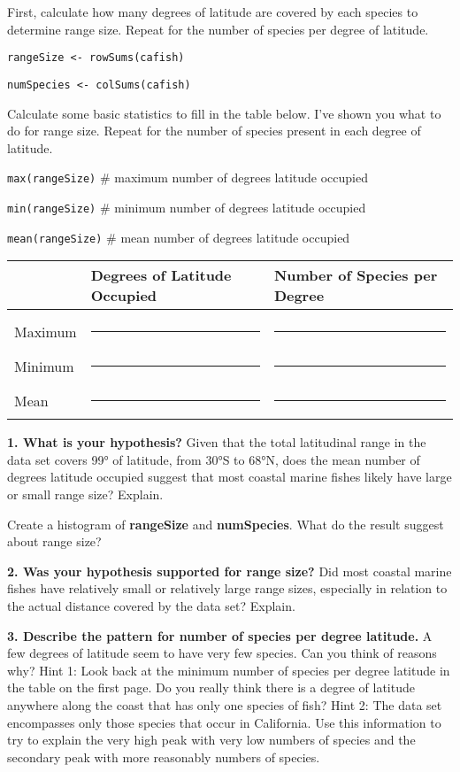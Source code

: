 \documentclass[11pt]{article}
\begin{document}
First, calculate how many degrees of latitude are covered by each
species to determine range size. Repeat for the number of species per
degree of latitude.

\texttt{rangeSize \textless{}- rowSums(cafish)}

\texttt{numSpecies \textless{}- colSums(cafish)}

Calculate some basic statistics to fill in the table below. I've shown
you what to do for range size. Repeat for the number of species present
in each degree of latitude.

\texttt{max(rangeSize)} \qquad \# maximum number of degrees latitude occupied

\texttt{min(rangeSize)} \qquad \# minimum number of degrees latitude occupied

\texttt{mean(rangeSize)} \qquad \# mean number of degrees latitude occupied

\begin{tabular}[l]{@{}lL{1.6in}L{1.6in}@{}}
\toprule
& Degrees of Latitude Occupied & Number of Species per Degree\tabularnewline
\midrule
 & & \\[1ex]
Maximum & \rule{1.5in}{0.4pt} & \rule{1.5in}{0.4pt} \tabularnewline[2ex]
Minimum & \rule{1.5in}{0.4pt} & \rule{1.5in}{0.4pt} \tabularnewline[2ex]
Mean & \rule{1.5in}{0.4pt} & \rule{1.5in}{0.4pt} \tabularnewline
\bottomrule
\end{tabular}

\textbf{1. What is your hypothesis?} Given that the total latitudinal range in
the data set covers 99° of latitude, from 30°S to 68°N, does the mean
number of degrees latitude occupied suggest that most coastal marine
fishes likely have large or small range size? Explain.

\vspace{7\baselineskip}

Create a histogram of \textbf{rangeSize} and \textbf{numSpecies}. What
do the result suggest about range size?

\textbf{2. Was your hypothesis supported for range size?} Did most coastal marine
fishes have relatively small or relatively large range sizes, especially
in relation to the actual distance covered by the data set? Explain.

\vspace{7\baselineskip}

\textbf{3. Describe the pattern for number of species per degree latitude.} A few
degrees of latitude seem to have very few species. Can you think of
reasons why? Hint 1: Look back at the minimum number of species per
degree latitude in the table on the first page. Do you really think
there is a degree of latitude anywhere along the coast that has only one
species of fish? Hint 2: The data set encompasses only those species
that occur in California. Use this information to try to explain the
very high peak with very low numbers of species and the secondary peak
with more reasonably numbers of species.
\end{document}
